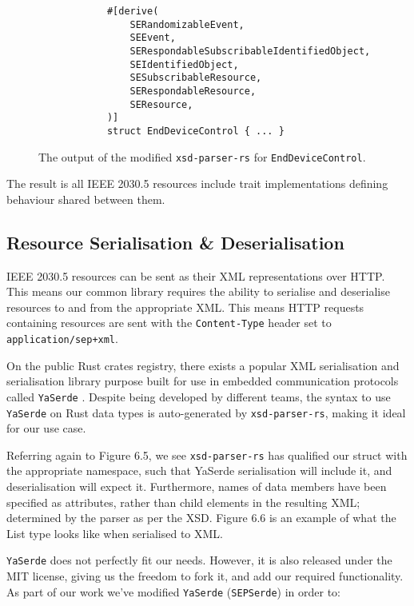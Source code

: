 \begin{figure}[H]
    \begin{center}
        \begin{lstlisting}
            #[derive(
                SERandomizableEvent,
                SEEvent,
                SERespondableSubscribableIdentifiedObject,
                SEIdentifiedObject,
                SESubscribableResource,
                SERespondableResource,
                SEResource,
            )]
            struct EndDeviceControl { ... }
        \end{lstlisting}
        \label{fig:edctraits}
        \caption{The output of the modified \texttt{xsd-parser-rs} for \texttt{EndDeviceControl}.}
    \end{center}
\end{figure}

The result is all IEEE 2030.5 resources include trait implementations defining behaviour shared between them. 

\subsection{Resource Serialisation \& Deserialisation}
IEEE 2030.5 resources can be sent as their XML representations over HTTP. This means our common library requires the ability to serialise and deserialise resources to and from the appropriate XML.
This means HTTP requests containing resources are sent with the \texttt{Content-Type} header set to \texttt{application/sep+xml}.

On the public Rust crates registry, there exists a popular XML serialisation and serialisation library purpose built for use in embedded communication protocols called \texttt{YaSerde} \cite[]{YaSerde}.
Despite being developed by different teams, the syntax to use \texttt{YaSerde} on Rust data types is auto-generated by \texttt{xsd-parser-rs}, making it ideal for our use case.

Referring again to Figure 6.5, we see \texttt{xsd-parser-rs} has qualified our struct with the appropriate namespace, such that YaSerde serialisation will include it, and deserialisation will expect it.
Furthermore, names of data members have been specified as attributes, rather than child elements in the resulting XML; determined by the parser as per the XSD.
Figure 6.6 is an example of what the List type looks like when serialised to XML.

\texttt{YaSerde} does not perfectly fit our needs. However, it is also released under the MIT license, giving us the freedom to fork it, and add our required functionality.
As part of our work we've modified \texttt{YaSerde} (\texttt{SEPSerde}) in order to:

